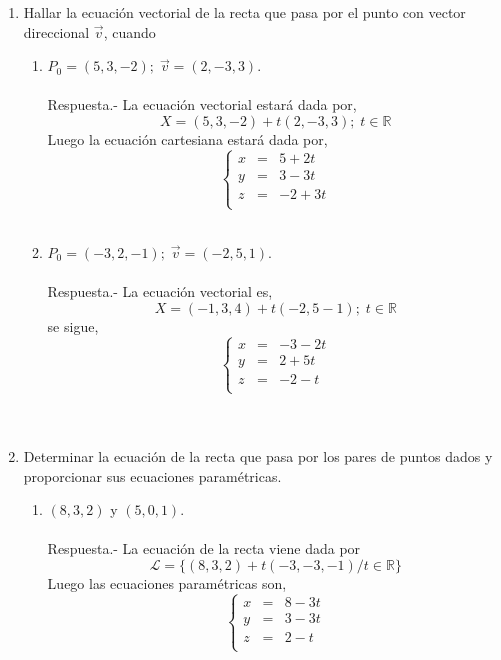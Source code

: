 \begin{enumerate}

    \item Hallar la ecuación vectorial de la recta que pasa por el punto con vector direccional $\vec{v}$, cuando 
	\begin{enumerate}[\bfseries a)]
	    
	    \item $P_0=(5,3,-2); \; \vec{v}=(2,-3,3)$.\\\\
		Respuesta.-\; La ecuación vectorial estará dada por, $$ X = (5,3,-2) + t(2,-3,3) ;\;  t \in \mathbb{R}$$ 
		Luego la ecuación cartesiana estará dada por, 
		$$\left\{\begin{array}{rcr}
		    x&=&5+2t\\
		    y&=&3-3t\\
		    z&=&-2+3t\\
		\end{array}\right.$$\\

	    \item $P_0=(-3,2,-1); \; \vec{v}=(-2,5,1)$.\\\\
		Respuesta.-\; La ecuación vectorial es, $$X= (-1,3,4) + t(-2,5-1) ;\;  t\in \mathbb{R} $$
		se sigue,
		$$\left\{\begin{array}{rcr}
		    x&=&-3-2t\\
		    y&=&2+5t\\
		    z&=&-2-t\\
		\end{array}\right.$$\\\\

	\end{enumerate}

    \item Determinar la ecuación de la recta que pasa por los pares de puntos dados y proporcionar sus ecuaciones paramétricas.

	\begin{enumerate}[\bfseries a)]
	    
	    \item $(8,3,2)$ y $(5,0,1)$.\\\\
		Respuesta.-\; La ecuación de la recta viene dada por 
		$$\mathcal{L} = \lbrace (8,3,2) + t(-3,-3,-1) / t\in \mathbb{R} \rbrace$$
		Luego las ecuaciones paramétricas son, 
		$$\left\{\begin{array}{rcr}
		    x&=&8-3t\\
		    y&=&3-3t\\
		    z&=&2-t\\
		\end{array}\right.$$\\


\end{enumerate}
\end{enumerate}
